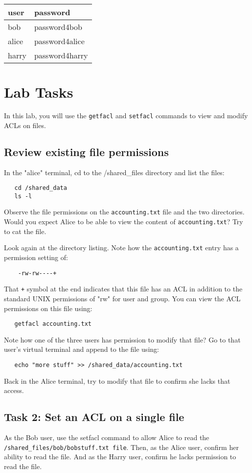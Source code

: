\medskip
{\begin{tabular}{ l | l  }

 \hline
 user & password \\ \hline
 bob & password4bob \\
 alice & password4alice \\
 harry & password4harry \\
\end{tabular}

\section{Lab Tasks}
In this lab, you will use the {\tt getfacl} and {\tt setfacl} commands to 
view and modify ACLs on files.

\subsection{Review existing file permissions}
In the "alice" terminal, cd to the /shared\_files directory and list
the files:
\begin{verbatim}
   cd /shared_data
   ls -l
\end{verbatim}
\noindent
Observe the file permissions on the {\tt accounting.txt} file and the two
directories.  Would you expect Alice to be able to view the content of
{\tt accounting.txt}?  Try to cat the file.

Look again at the directory listing.  Note how the {\tt accounting.txt}
entry has a permission setting of:
\begin{verbatim}
    -rw-rw----+
\end{verbatim}
That {\tt +} symbol at the end indicates that this file has an ACL in addition
to the standard UNIX permissions of "rw" for user and group.  You can view the
ACL permissions on this file using:
\begin{verbatim}
   getfacl accounting.txt
\end{verbatim}

Note how one of the three users has permission to modify that file?  Go to that
user's virtual terminal and append to the file using:
\begin{verbatim}
   echo "more stuff" >> /shared_data/accounting.txt
\end{verbatim}

Back in the Alice terminal, try to modify that file to confirm she lacks that access.


\subsection{Task 2: Set an ACL on a single file}
As the Bob user, use the setfacl command to allow Alice to read the
{\tt /shared\_files/bob/bobstuff.txt file}.  Then, as the Alice user,
confirm her ability to read the file.  And as the Harry user, confirm
he lacks permission to read the file.


}
